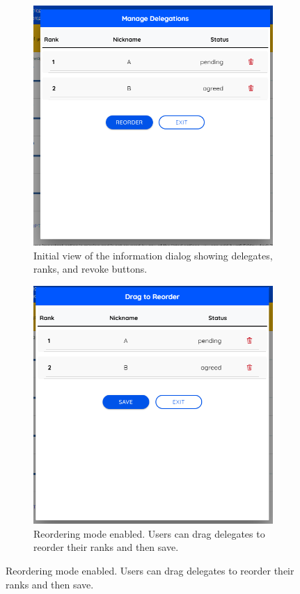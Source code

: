 \begin{figure}[H]
  \centering
  
  \begin{subfigure}{0.45\textwidth}
  \centering
  \includegraphics[width=\linewidth]{../common/vodle_screenshots/ranked_info.png}
  \caption{Initial view of the information dialog showing delegates, ranks, and revoke buttons.}
  \end{subfigure}
  \hfill
  \begin{subfigure}{0.45\textwidth}
  \centering
  \includegraphics[width=\linewidth]{../common/vodle_screenshots/ranked_info_reorder.png}
  \caption{Reordering mode enabled. Users can drag delegates to reorder their ranks and then save.}
  \end{subfigure}
  

\end{figure}
